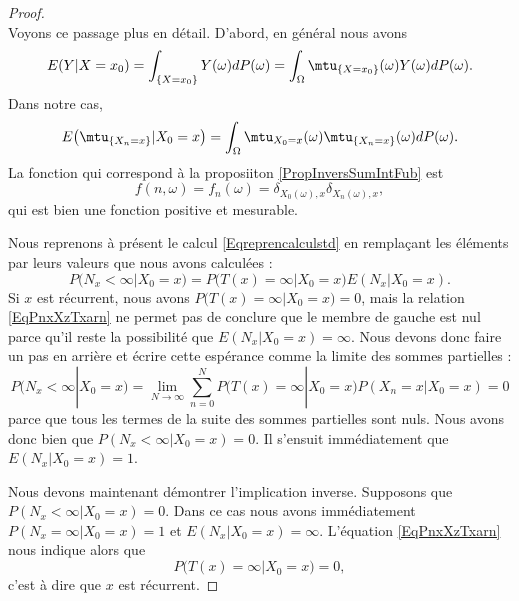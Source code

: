 \begin{proof}
\begin{subequations}
    \end{subequations}
    Voyons ce passage plus en détail. D'abord, en général nous avons
    \begin{equation}
            E(Y|X=x_0)=\int_{\{ X=x_0 \}}Y(\omega)dP(\omega)
            =\int_{\Omega}\mtu_{\{ X=x_0 \}}(\omega)Y(\omega)dP(\omega).
    \end{equation}
    Dans notre cas,
    \begin{equation}
        E\big( \mtu_{\{ X_n=x \}}|X_0=x \big)=\int_{\Omega}\mtu_{X_0=x}(\omega)\mtu_{\{ X_n=x \}}(\omega)dP(\omega).
    \end{equation}
    La fonction qui correspond à la proposiiton \ref{PropInversSumIntFub} est
    \begin{equation}
        f(n,\omega)=f_n(\omega)=\delta_{X_0(\omega),x}\delta_{X_n(\omega),x},
    \end{equation}
    qui est bien une fonction positive et mesurable.

    Nous reprenons à présent le calcul \eqref{Eqreprencalculstd} en remplaçant les éléments par leurs valeurs que nous avons calculées :
    \begin{equation}    \label{EqPnxXzTxarn}
        P(N_x<\infty|X_0=x)=P\big(T(x)=\infty|X_0=x\big)E(N_x|X_0=x).
    \end{equation}
    Si \( x\) est récurrent, nous avons \( P\big( T(x)=\infty|X_0=x \big)=0\), mais la relation \eqref{EqPnxXzTxarn} ne permet pas de conclure que le membre de gauche est nul parce qu'il reste la possibilité que \( E(N_x|X_0=x)=\infty\). Nous devons donc faire un pas en arrière et écrire cette espérance comme la limite des sommes partielles :
    \begin{equation}
        P(N_x<\infty|X_0=x)=\lim_{N\to \infty} \sum_{n=0}^NP\big( T(x)=\infty|X_0=x \big)P(X_n=x|X_0=x)=0
    \end{equation}
    parce que tous les termes de la suite des sommes partielles sont nuls. Nous avons donc bien que \( P(N_x<\infty|X_0=x)=0\). Il s'ensuit immédiatement que \( E(N_x|X_0=x)=1\).

    Nous devons maintenant démontrer l'implication inverse. Supposons que \( P(N_x<\infty|X_0=x)=0\). Dans ce cas nous avons immédiatement \( P(N_x=\infty|X_0=x)=1\) et \( E(N_x|X_0=x)=\infty\). L'équation \eqref{EqPnxXzTxarn} nous indique alors que 
    \begin{equation}
        P\big( T(x)=\infty|X_0=x \big)=0,
    \end{equation}
    c'est à dire que \( x\) est récurrent.
\end{proof}


